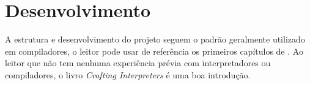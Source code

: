 \chapter{Desenvolvimento}

A estrutura e desenvolvimento do projeto
seguem o padrão geralmente utilizado em compiladores,
o leitor pode usar de referência os primeiros capítulos
de \cite{torczon2011engineering}.
Ao leitor que não tem nenhuma experiência prévia com
interpretadores ou compiladores,
o livro \textit{Crafting Interpreters}
\cite{nystrom2021crafting} é uma boa introdução. 





